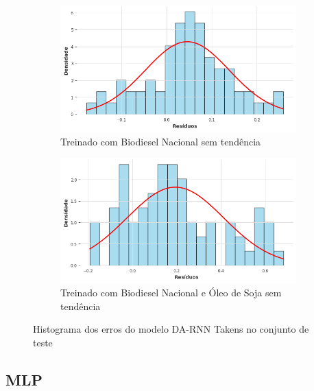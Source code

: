 \begin{figure}[htbp]
	\begin{subfigure}[b]{0.40\textwidth}
		\centering
		\includegraphics[width=\textwidth]{figuras/darnn_takens_brasil_detrend_residuals_histogram.png} %
		\caption{Treinado com Biodiesel Nacional sem tendência}
		\label{fig:darnn_takens_brasil_detrend_residuals_histogram}
	\end{subfigure}
	\hfill
	\begin{subfigure}[b]{0.40\textwidth}
		\centering
		\includegraphics[width=\textwidth]{figuras/darnn_takens_brasil_oil_detrend_residuals_histogram.png} %
		\caption{Treinado com Biodiesel Nacional e Óleo de Soja sem tendência}
		\label{fig:darnn_takens_brasil_oil_detrend_residuals_histogram}
	\end{subfigure}

	\caption{Histograma dos erros do modelo \acs{DA-RNN} Takens no conjunto de teste}
	\label{fig:darnn_takens_residuals_histogram}
\end{figure}

\subsection{\acs{MLP}}
